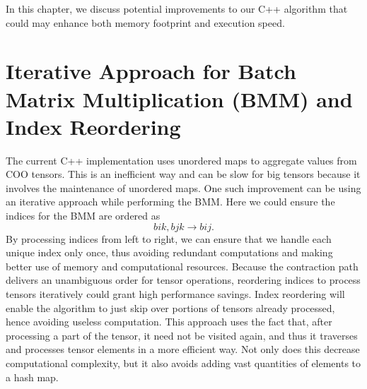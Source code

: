 In this chapter, we discuss potential improvements to our C++ algorithm that could
may enhance both memory footprint and execution speed.

\section{Iterative Approach for Batch Matrix Multiplication (BMM) and Index Reordering}
The current C++ implementation uses unordered maps to aggregate values from COO tensors.
This is an inefficient way and can be slow for big tensors because it involves the
maintenance of unordered maps. One such improvement can be using an iterative approach
while performing the BMM. Here we could ensure the indices for the BMM are ordered as
\begin{equation*}
    bik, bjk \rightarrow bij.
\end{equation*}
By processing indices from left to right, we can ensure that we handle each unique index
only once, thus avoiding redundant computations and making better use of memory and
computational resources. Because the contraction path delivers an unambiguous order for
tensor operations, reordering indices to process tensors iteratively could grant high
performance savings. Index reordering will enable the algorithm to just skip over portions
of tensors already processed, hence avoiding useless computation. This approach uses the
fact that, after processing a part of the tensor, it need not be visited again, and thus
it traverses and processes tensor elements in a more efficient way. Not only does this
decrease computational complexity, but it also avoids adding vast quantities of elements
to a hash map.

